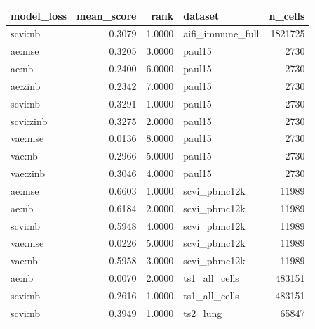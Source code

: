 \begin{tabular}{lrrlr}
\toprule
model\_loss & mean\_score & rank & dataset & n\_cells \\
\midrule
scvi:nb & 0.3079 & 1.0000 & aifi\_immune\_full & 1821725 \\
ae:mse & 0.3205 & 3.0000 & paul15 & 2730 \\
ae:nb & 0.2400 & 6.0000 & paul15 & 2730 \\
ae:zinb & 0.2342 & 7.0000 & paul15 & 2730 \\
scvi:nb & 0.3291 & 1.0000 & paul15 & 2730 \\
scvi:zinb & 0.3275 & 2.0000 & paul15 & 2730 \\
vae:mse & 0.0136 & 8.0000 & paul15 & 2730 \\
vae:nb & 0.2966 & 5.0000 & paul15 & 2730 \\
vae:zinb & 0.3046 & 4.0000 & paul15 & 2730 \\
ae:mse & 0.6603 & 1.0000 & scvi\_pbmc12k & 11989 \\
ae:nb & 0.6184 & 2.0000 & scvi\_pbmc12k & 11989 \\
scvi:nb & 0.5948 & 4.0000 & scvi\_pbmc12k & 11989 \\
vae:mse & 0.0226 & 5.0000 & scvi\_pbmc12k & 11989 \\
vae:nb & 0.5958 & 3.0000 & scvi\_pbmc12k & 11989 \\
ae:nb & 0.0070 & 2.0000 & ts1\_all\_cells & 483151 \\
scvi:nb & 0.2616 & 1.0000 & ts1\_all\_cells & 483151 \\
scvi:nb & 0.3949 & 1.0000 & ts2\_lung & 65847 \\
\bottomrule
\end{tabular}
